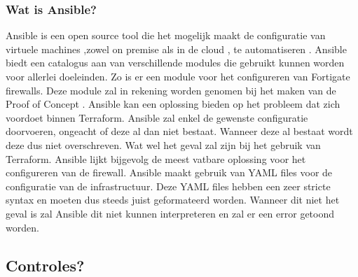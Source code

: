 \subsubsection{Wat is Ansible?}
\label{sec:Wat is ansible}
Ansible is een open source tool die het mogelijk maakt de configuratie van virtuele machines ,zowel on premise als in de cloud , te automatiseren \autocite{Hat}. Ansible biedt een catalogus aan van verschillende modules die gebruikt kunnen worden voor allerlei doeleinden. Zo is er een module voor het configureren van Fortigate firewalls. Deze module zal in rekening worden genomen bij het maken van de Proof of Concept \autocite{Fortinet2020}. Ansible kan een oplossing bieden op het probleem dat zich voordoet binnen Terraform. Ansible zal enkel de gewenste configuratie doorvoeren, ongeacht of deze al dan niet bestaat. Wanneer deze al bestaat wordt deze dus niet overschreven. Wat wel het geval zal zijn bij het gebruik van Terraform. Ansible lijkt bijgevolg de meest vatbare oplossing voor het configureren van de firewall. Ansible maakt gebruik van YAML files voor de configuratie van de infrastructuur. Deze YAML files hebben een zeer stricte syntax en moeten dus steeds juist geformateerd worden. Wanneer dit niet het geval is zal Ansible dit niet kunnen interpreteren en zal er een error getoond worden.

\subsection{Controles?}

